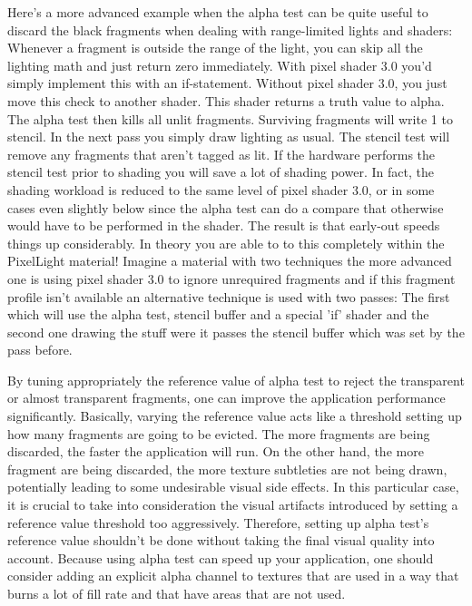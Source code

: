 Here's a more advanced example when the alpha test can be quite useful to discard the black fragments
when dealing with range-limited lights and shaders:\\
Whenever a fragment is outside the range of the light, you can skip all the lighting math and just return
zero immediately. With pixel shader 3.0 you'd simply implement this with an if-statement. Without pixel
shader 3.0, you just move this check to another shader. This shader returns a truth value to alpha. The
alpha test then kills all unlit fragments. Surviving fragments will write 1 to stencil. In the next pass
you simply draw lighting as usual. The stencil test will remove any fragments that aren't tagged as lit.
If the hardware performs the stencil test prior to shading you will save a lot of shading power. In fact,
the shading workload is reduced to the same level of pixel shader 3.0, or in some cases even slightly below
since the alpha test can do a compare that otherwise would have to be performed in the shader. 
The result is that early-out speeds things up considerably. In theory you are able to to this completely within
the PixelLight material! Imagine a material with two techniques the more advanced one is using pixel shader 3.0 to ignore
unrequired fragments and if this fragment profile isn't available an alternative technique is used with two
passes: The first which will use the alpha test, stencil buffer and a special 'if' shader and the second one drawing
the stuff were it passes the stencil buffer which was set by the pass before.

By tuning appropriately the reference value of alpha test to reject the transparent or almost transparent
fragments, one can improve the application performance significantly. Basically, varying the reference value
acts like a threshold setting up how many fragments are going to be evicted. The more fragments
are being discarded, the faster the application will run. On the other hand, the more
fragment are being discarded, the more texture subtleties are not being drawn, potentially
leading to some undesirable visual side effects. In this particular case, it is crucial to take
into consideration the visual artifacts introduced by setting a reference value threshold
too aggressively. Therefore, setting up alpha test's reference value shouldn't be done
without taking the final visual quality into account.
Because using alpha test can speed up your application, one should consider adding an
explicit alpha channel to textures that are used in a way that burns a lot of fill rate and
that have areas that are not used.
